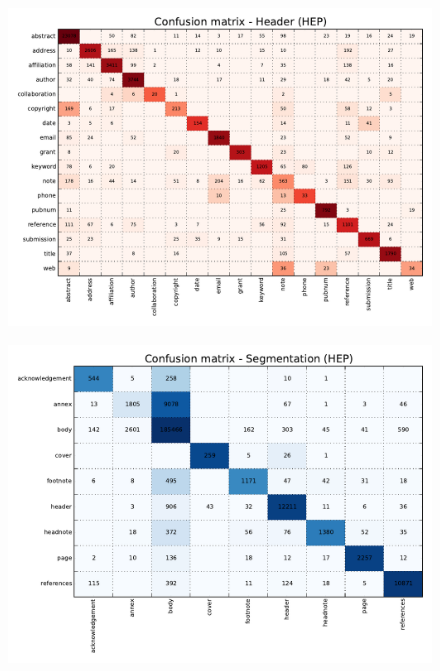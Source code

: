 \begin{figure}[h]
\center
\includegraphics[width=5.5in]{Figures/header_baseline_confusion.pdf}
\caption{}
\label{fig:header_baseline_confusion}
\end{figure}

\begin{figure}[h]
\center
\includegraphics[width=5.5in]{Figures/segmentation_baseline_confusion.pdf}
\caption{}
\label{fig:segmentation_baseline_confusion}
\end{figure}

